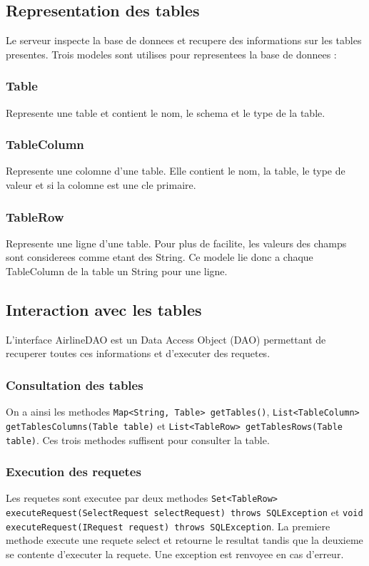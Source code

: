 \subsection{Representation des tables}
Le serveur inspecte la base de donnees et recupere des informations sur les tables presentes. Trois modeles sont utilises pour representees la base de donnees :
\subsubsection{Table}
Represente une table et contient le nom, le schema et le type de la table.
\subsubsection{TableColumn}
Represente une colomne d'une table. Elle contient le nom, la table, le type de valeur et si la colomne est une cle primaire.
\subsubsection{TableRow}
Represente une ligne d'une table. Pour plus de facilite, les valeurs des champs sont considerees comme etant des String. Ce modele lie donc a chaque TableColumn de la table un String pour une ligne.
\subsection{Interaction avec les tables}
L'interface AirlineDAO est un Data Access Object (DAO) permettant de recuperer toutes ces informations et d'executer des requetes. 
\subsubsection{Consultation des tables}
On a ainsi les methodes \texttt{Map<String, Table> getTables()}, \texttt{List<TableColumn> getTablesColumns(Table table)} et \texttt{List<TableRow> getTablesRows(Table table)}. Ces trois methodes suffisent pour consulter la table.
\subsubsection{Execution des requetes}
Les requetes sont executee par deux methodes \texttt{Set<TableRow> executeRequest(SelectRequest selectRequest) throws SQLException} et \texttt{void executeRequest(IRequest request) throws SQLException}. La premiere methode execute une requete select et retourne le resultat tandis que la deuxieme se contente d'executer la requete. Une exception est renvoyee en cas d'erreur.

